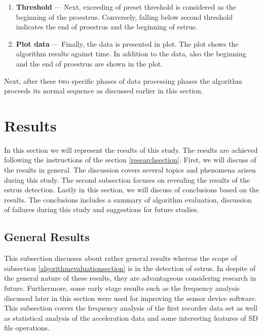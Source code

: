 \documentclass[english,12pt,a4paper,pdftex,elec,utf8]{aaltothesis}
\begin{document}
\begin{enumerate}
\item \textbf{Threshold} --- Next, exceeding of preset threshold is considered as the beginning of the proestrus. Conversely, falling below second threshold indicates the end of proestrus and the beginning of estrus.

\item \textbf{Plot data} --- Finally, the data is presented in plot. The plot shows the algorithm results against time. In addition to the data, also the beginning and the end of proestrus are shown in the plot.


\end{enumerate}

Next, after these two specific phases of data processing phases the algorithm proceeds its normal sequence as discussed earlier in this section.


\clearpage

\section{Results} \label{resultssection}
 
In this section we will represent the results of this study. The results are achieved following the instructions of the section \ref{researchsection}. First, we will discuss of the results in general. The discussion covers several topics and phenomena arisen during this study. The second subsection focuses on revealing the results of the estrus detection. Lastly in this section, we will discuss of conclusions based on the results. The conclusions includes a summary of algorithm evaluation, discussion of failures during this study and suggestions for future studies.



\subsection{General Results} \label{generalresultssection}

This subsection discusses about rather general results whereas the scope of subsection \ref{algorithmevaluationsection} is in the detection of estrus. In despite of the general nature of these results, they are advantageous considering research in future. Furthermore, some early stage results such as the frequency analysis discussed later in this section were used for improving the sensor device software. This subsection covers the frequency analysis of the first recorder data set as well as statistical analysis of the acceleration data and some interesting features of SD file operations.
\end{document}

